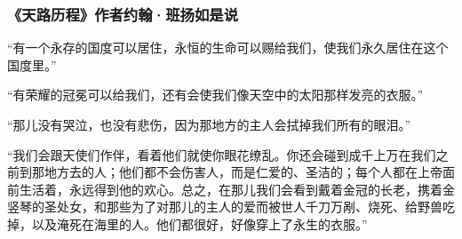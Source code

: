 \subsubsection*{《天路历程》作者约翰·班扬如是说}

“有一个永存的国度可以居住，永恒的生命可以赐给我们，使我们永久居住在这个国度里。”
\par

“有荣耀的冠冕可以给我们，还有会使我们像天空中的太阳那样发亮的衣服。”
\par

“那儿没有哭泣，也没有悲伤，因为那地方的主人会拭掉我们所有的眼泪。”
\par

“我们会跟天使们作伴，看着他们就使你眼花缭乱。你还会碰到成千上万在我们之前到那地方去的人；他们都不会伤害人，而是仁爱的、圣洁的；每个人都在上帝面前生活着，永远得到他的欢心。总之，在那儿我们会看到戴着金冠的长老，携着金竖琴的圣处女，和那些为了对那儿的主人的爱而被世人千刀万剐、烧死、给野兽吃掉，以及淹死在海里的人。他们都很好，好像穿上了永生的衣服。”
\par
